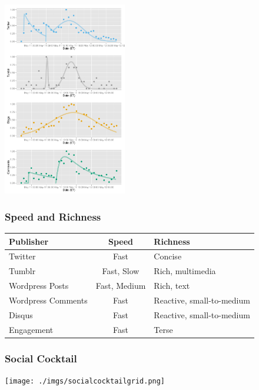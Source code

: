 \documentclass{beamer}
\begin{document}

\begin{frame}
  \begin{center}
    \includegraphics[height=8.5cm]{./imgs/JPMorgan.pdf}
  \end{center}
\end{frame}


\begin{frame} \frametitle{Speed and Richness}
\begin{table}
\begin{tabular}{m{2cm}| c |m{3cm}}
\hline
   {Publisher}   &   {Speed} & {Richness} \\
\hline 
    Twitter       & Fast & Concise  \\ [3pt]
    Tumblr       & Fast, Slow & Rich, multimedia\\  [3pt]
    Wordpress Posts & Fast, Medium &  Rich, text\\  [3pt]
    Wordpress Comments  & Fast & Reactive, small-to-medium\\  [3pt]
    Disqus         & Fast & Reactive, small-to-medium\\  [3pt]
    Engagement   & Fast & Terse\\ 
\hline
\end{tabular}
\end{table}
\end{frame}


\begin{frame}\frametitle{Social Cocktail}
  \begin{center}
    \texttt{[image: ./imgs/socialcocktailgrid.png]}
  \end{center}
\end{frame}
\end{document}

